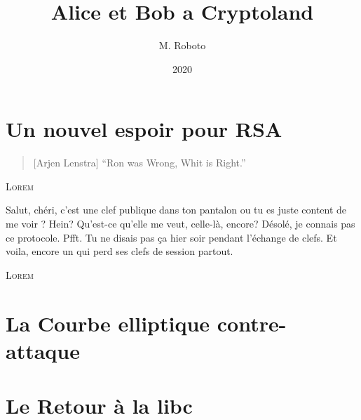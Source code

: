 \documentclass[a4paper,12pt,oneside]{memoir}
\title{Alice et Bob a Cryptoland}
\author{M. Roboto}
\date{2020}
\begin{document}
\maketitle
\tableofcontents*

\chapter{Un nouvel espoir pour RSA}

\begin{quote}[Arjen Lenstra]
	\enquote{Ron was Wrong, Whit is Right.}
\end{quote}	

\lettrine{L}{orem} \lipsum[1-4]

\begin{chatlog}
	\say[Alice] Salut, chéri, c'est une clef publique dans ton pantalon ou tu es juste content de me voir ?
	\think[Bob] Hein? Qu'est-ce qu'elle me veut, celle-là, encore?
	\say[Bob] Désolé, je connais pas ce protocole.
	\say[Alice] Pfft. Tu ne disais pas ça hier soir pendant l'échange de clefs.
	\think[Alice] Et voila, encore un qui perd ses clefs de session partout.
\end{chatlog}

\lettrine{L}{orem} \lipsum[5-7]


\chapter{La Courbe elliptique contre-attaque}

\lipsum

\chapter{Le Retour à la libc}

\lipsum
\end{document}
